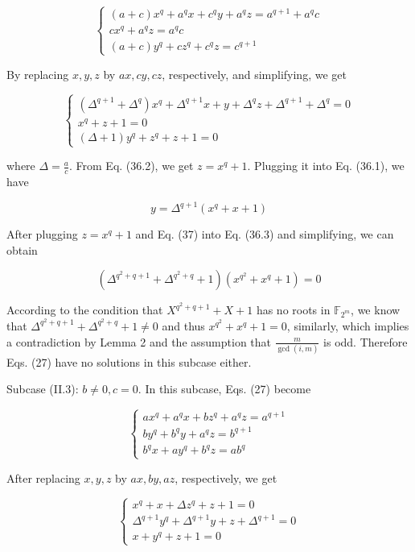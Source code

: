 \documentclass[10pt]{article}
\begin{document}
\[
\left\{\begin{array}{l}
(a+c) x^{q}+a^{q} x+c^{q} y+a^{q} z=a^{q+1}+a^{q} c  \tag{35.1}\\
c x^{q}+a^{q} z=a^{q} c \\
(a+c) y^{q}+c z^{q}+c^{q} z=c^{q+1}
\end{array}\right.
\]

By replacing $x, y, z$ by $a x, c y, c z$, respectively, and simplifying, we get

\[
\left\{\begin{array}{l}
\left(\Delta^{q+1}+\Delta^{q}\right) x^{q}+\Delta^{q+1} x+y+\Delta^{q} z+\Delta^{q+1}+\Delta^{q}=0  \tag{36.1}\\
x^{q}+z+1=0 \\
(\Delta+1) y^{q}+z^{q}+z+1=0
\end{array}\right.
\]

where $\Delta=\frac{a}{c}$. From Eq. (36.2), we get $z=x^{q}+1$. Plugging it into Eq. (36.1), we have


\begin{equation*}
y=\Delta^{q+1}\left(x^{q}+x+1\right) \tag{37}
\end{equation*}


After plugging $z=x^{q}+1$ and Eq. (37) into Eq. (36.3) and simplifying, we can obtain

$$
\left(\Delta^{q^{2}+q+1}+\Delta^{q^{2}+q}+1\right)\left(x^{q^{2}}+x^{q}+1\right)=0
$$

According to the condition that $X^{q^{2}+q+1}+X+1$ has no roots in $\mathbb{F}_{2^{m}}$, we know that $\Delta^{q^{2}+q+1}+\Delta^{q^{2}+q}+1 \neq 0$ and thus $x^{q^{2}}+x^{q}+1=0$, similarly, which implies a contradiction by Lemma 2 and the assumption that $\frac{m}{\operatorname{gcd}(i, m)}$ is odd. Therefore Eqs. (27) have no solutions in this subcase either.

Subcase (II.3): $b \neq 0, c=0$. In this subcase, Eqs. (27) become

\[
\left\{\begin{array}{l}
a x^{q}+a^{q} x+b z^{q}+a^{q} z=a^{q+1}  \tag{38.1}\\
b y^{q}+b^{q} y+a^{q} z=b^{q+1} \\
b^{q} x+a y^{q}+b^{q} z=a b^{q}
\end{array}\right.
\]

After replacing $x, y, z$ by $a x, b y, a z$, respectively, we get

\[
\left\{\begin{array}{l}
x^{q}+x+\Delta z^{q}+z+1=0  \tag{39.1}\\
\Delta^{q+1} y^{q}+\Delta^{q+1} y+z+\Delta^{q+1}=0 \\
x+y^{q}+z+1=0
\end{array}\right.
\]
\end{document}
